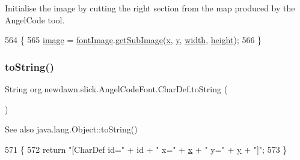 Initialise the image by cutting the right section from the map produced by the Angel\+Code tool. 
\begin{DoxyCode}
564                            \{
565             \mbox{\hyperlink{classorg_1_1newdawn_1_1slick_1_1_angel_code_font_1_1_char_def_ab62aa3bc9bf07629c6df438860b2fe73}{image}} = \mbox{\hyperlink{classorg_1_1newdawn_1_1slick_1_1_angel_code_font_a891bf3b2a299313dc4f37c3808982aba}{fontImage}}.\mbox{\hyperlink{classorg_1_1newdawn_1_1slick_1_1_image_a2ccb3bbdda674f9efdec614a54e31e32}{getSubImage}}(\mbox{\hyperlink{classorg_1_1newdawn_1_1slick_1_1_angel_code_font_1_1_char_def_a528f233655a70cbf7dcbae24d6bb3ae4}{x}}, \mbox{\hyperlink{classorg_1_1newdawn_1_1slick_1_1_angel_code_font_1_1_char_def_a00004936be32e58efcc3b1da7d97108b}{y}}, \mbox{\hyperlink{classorg_1_1newdawn_1_1slick_1_1_angel_code_font_1_1_char_def_a2a89d623dcb4a2faadfa804a76bdf6d9}{width}}, 
      \mbox{\hyperlink{classorg_1_1newdawn_1_1slick_1_1_angel_code_font_1_1_char_def_a22e24871275204c15c2e4a96875d8e57}{height}});
566         \}
\end{DoxyCode}
\mbox{\label{classorg_1_1newdawn_1_1slick_1_1_angel_code_font_1_1_char_def_a45a232a9574e081d09124fce30b8989f}} 
\subsubsection{\texorpdfstring{to\+String()}{toString()}}
{\footnotesize\ttfamily String org.\+newdawn.\+slick.\+Angel\+Code\+Font.\+Char\+Def.\+to\+String (\begin{DoxyParamCaption}{ }\end{DoxyParamCaption})\hspace{0.3cm}{\ttfamily [inline]}}

\begin{DoxySeeAlso}{See also}
java.\+lang.\+Object\+::to\+String() 
\end{DoxySeeAlso}

\begin{DoxyCode}
571                                  \{
572             \textcolor{keywordflow}{return} \textcolor{stringliteral}{"[CharDef id="} + \textcolor{keywordtype}{id} + \textcolor{stringliteral}{" x="} + \mbox{\hyperlink{classorg_1_1newdawn_1_1slick_1_1_angel_code_font_1_1_char_def_a528f233655a70cbf7dcbae24d6bb3ae4}{x}} + \textcolor{stringliteral}{" y="} + \mbox{\hyperlink{classorg_1_1newdawn_1_1slick_1_1_angel_code_font_1_1_char_def_a00004936be32e58efcc3b1da7d97108b}{y}} + \textcolor{stringliteral}{"]"};
573         \}
\end{DoxyCode}


